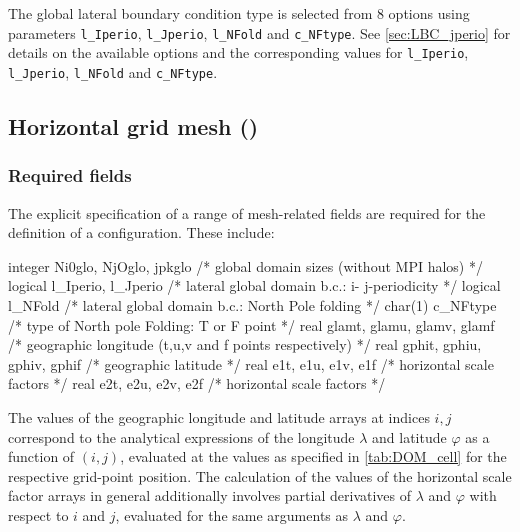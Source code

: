 \documentclass[../main/NEMO_manual]{subfiles}
\begin{document}
The global lateral boundary condition type is selected from 8 options using parameters \texttt{l\_Iperio}, \texttt{l\_Jperio}, \texttt{l\_NFold} and \texttt{c\_NFtype}.
See \autoref{sec:LBC_jperio} for details on the available options and
the corresponding values for \texttt{l\_Iperio}, \texttt{l\_Jperio}, \texttt{l\_NFold} and \texttt{c\_NFtype}.

\subsection[Horizontal grid mesh (\textit{domhgr.F90}]{Horizontal grid mesh (\protect{})}
\label{subsec:DOM_hgr}

\subsubsection{Required fields}
\label{sec:DOM_hgr_fields}

The explicit specification of a range of mesh-related fields are required for
the definition of a configuration.
These include:

\begin{forlines}
integer   Ni0glo, NjOglo, jpkglo       /* global domain sizes (without MPI halos)                */
logical   l_Iperio, l_Jperio           /* lateral global domain b.c.: i- j-periodicity           */
logical   l_NFold                      /* lateral global domain b.c.: North Pole folding         */
char(1)   c_NFtype                     /*    type of North pole Folding: T or F point            */
real      glamt, glamu, glamv, glamf   /* geographic longitude (t,u,v and f points respectively) */
real      gphit, gphiu, gphiv, gphif   /* geographic latitude                                    */
real      e1t, e1u, e1v, e1f           /* horizontal scale factors                               */
real      e2t, e2u, e2v, e2f           /* horizontal scale factors                               */
\end{forlines}

The values of the geographic longitude and latitude arrays at indices $i,j$ correspond to
the analytical expressions of the longitude $\lambda$ and latitude $\varphi$ as a function of $(i,j)$,
evaluated at the values as specified in \autoref{tab:DOM_cell} for the respective grid-point position.
The calculation of the values of the horizontal scale factor arrays in general additionally involves
partial derivatives of $\lambda$ and $\varphi$ with respect to $i$ and $j$,
evaluated for the same arguments as $\lambda$ and $\varphi$.
\end{document}
